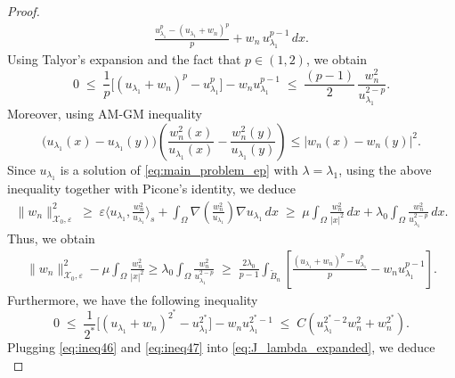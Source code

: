 \documentclass[11pt]{article}
\newcommand{\la} {\lambda}
\newcommand{\lv}{\lVert}
\newcommand{\rv}{\rVert}
\newcommand{\Xe}{\mathcal{X}_{0},\varepsilon} %
\begin{document}
\begin{proof}
\begin{align}
\frac{u_{\lambda_1}^p - (u_{\lambda_1}+w_n)^p}{p} 
+ w_n \, u_{\lambda_1}^{p-1} \, dx .\label{eq:J_lambda_expanded} 
\end{align}
Using Talyor's expansion and the fact that \( p \in (1,2) \), we obtain
\begin{equation*}
0 \;\leq\; \frac{1}{p} \Big[ (u_{\lambda_1}+w_n)^p - u_{\lambda_1}^p \Big] - w_n u_{\lambda_1}^{p-1} 
\;\leq\; \frac{(p-1)}{2} \, \frac{w_n^2}{u_{\lambda_1}^{2-p}}.
\end{equation*}
Moreover, using AM-GM inequality
\begin{equation*}
\big(u_{\lambda_1}(x) - u_{\lambda_1}(y)\big) 
\left( \frac{w_n^2(x)}{u_{\lambda_1}(x)} - \frac{w_n^2(y)}{u_{\lambda_1}(y)} \right) \leq |w_n(x) - w_n(y)|^2 .
\end{equation*}
Since \( u_{\lambda_1} \) is a solution of \eqref{eq:main_problem_ep} with $\la = \la_1$, using the above inequality together with Picone’s identity, we deduce
\begin{equation*}
\begin{aligned}
\lv w_n \rv_{\Xe}^2\;\geq\; \varepsilon \Big\langle u_{\lambda_1}, \frac{w_n^2}{u_{\lambda_1}} \Big\rangle_s 
+ \int_{\Omega} \nabla \!\left( \frac{w_n^2}{u_{\lambda_1}} \right) \nabla u_{\lambda_1} \, dx \;\geq\; \mu \int_{\Omega} \frac{w_n^2}{|x|^2} \, dx 
+ \lambda_0 \int_{\Omega} \frac{w_n^2}{u_{\lambda_1}^{2-p}} \, dx .
\end{aligned}
\end{equation*}
Thus, we obtain
\begin{equation}
\begin{aligned}
\lv w_n \rv_{\Xe}^2 - \mu \int_{\Omega} \frac{w_n^2}{|x|^2} \geq \lambda_0 \int_{\Omega} \frac{w_n^2}{u_{\lambda_1}^{2-p}}  \;\geq\; \frac{2 \la_0}{p-1} 
\int_{\widetilde{B}_n} 
\left[ \frac{(u_{\lambda_1}+w_n)^p - u_{\lambda_1}^p}{p} 
- w_n u_{\lambda_1}^{p-1} \right].
\end{aligned}
\label{eq:ineq46}
\end{equation}
Furthermore, we have the following inequality
\begin{equation}
0 \;\leq\; \frac{1}{2^*} \Big[ (u_{\lambda_1}+w_n)^{2^*} - u_{\lambda_1}^{2^*} \Big] - w_n u_{\lambda_1}^{2^*-1}
\;\leq\; C \left( u_{\lambda_1}^{2^*-2} w_n^2 + w_n^{2^*} \right).
\label{eq:ineq47}
\end{equation}
Plugging \eqref{eq:ineq46} and \eqref{eq:ineq47} into \eqref{eq:J_lambda_expanded}, we deduce
\begin{equation*}

\end{equation*}
\end{proof}
\end{document}

